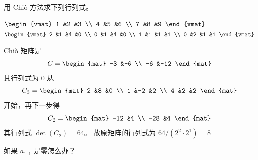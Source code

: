\begin{exercises}
  \item 
    用 Chiò 方法求下列行列式。
    \begin{exparts*}
      \partsitem 
        $
        \begin{vmat}
          1  &2  &3  \\
          4  &5  &6  \\
          7  &8  &9  
        \end{vmat}
        $
      \partsitem 
        $
        \begin{vmat}
          2  &1  &4  &0  \\
          0  &1  &4  &0  \\
          1  &1  &1  &1  \\
          0  &2  &1  &1  
        \end{vmat}
        $
    \end{exparts*}
    \begin{answer}
      \begin{exparts*}
        \partsitem Chiò 矩阵是
        \begin{equation*}
          C=
          \begin{mat}
            -3 &-6 \\
            -6 &-12
          \end{mat}
        \end{equation*}
        其行列式为 $0$
        \partsitem 从
        \begin{equation*}
          C_3=
          \begin{mat}
            2 &8  &0 \\
            1 &-2 &2 \\
            4 &2  &2
          \end{mat}
        \end{equation*}
        开始，再下一步得
        \begin{equation*}
          C_2=
          \begin{mat}
            -12 &4 \\
            -28 &4
          \end{mat}
        \end{equation*}
        其行列式 $\det(C_2)=64$。 
        故原矩阵的行列式为 $64/(2^2\cdot 2^1)=8$
      \end{exparts*} 
    \end{answer}
  \item 如果 $a_{1,1}$ 是零怎么办？
    \begin{answer}

\end{answer}
\end{exercises}
